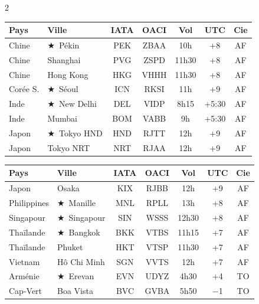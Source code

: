 \documentclass[9pt,a4paper,landscape]{article}
\newcommand{\sectionbanner}[2]{%
\noindent\colorbox{#1}{\parbox{\dimexpr\textwidth-2\fboxsep}{%
\vspace{3pt}\hspace{6pt}{\Large\bfseries\color{white}#2}\vspace{3pt}}}%
\vspace{4pt}%
}
\newcommand{\CAP}{\textcolor{capgold}{$\bigstar$}}
\begin{document}
\begin{multicols}{2}
\scriptsize
\begin{tabular}{@{}l l c c c c c@{}}
\toprule
\textbf{Pays} & \textbf{Ville} & \textbf{IATA} & \textbf{OACI} & \textbf{Vol} & \textbf{UTC} & \textbf{Cie} \\
\midrule
\rowcolor{asilight} Chine & \CAP\ Pékin & PEK & ZBAA & 10h & +8 & AF \\
Chine & Shanghai & PVG & ZSPD & 11h30 & +8 & AF \\
\rowcolor{asilight} Chine & Hong Kong & HKG & VHHH & 11h30 & +8 & AF \\
Corée S. & \CAP\ Séoul & ICN & RKSI & 11h & +9 & AF \\
\rowcolor{asilight} Inde & \CAP\ New Delhi & DEL & VIDP & 8h15 & +5:30 & AF \\
Inde & Mumbai & BOM & VABB & 9h & +5:30 & AF \\
\rowcolor{asilight} Japon & \CAP\ Tokyo HND & HND & RJTT & 12h & +9 & AF \\
Japon & Tokyo NRT & NRT & RJAA & 12h & +9 & AF \\
\bottomrule
\end{tabular}

\columnbreak

\begin{tabular}{@{}l l c c c c c@{}}
\toprule
\textbf{Pays} & \textbf{Ville} & \textbf{IATA} & \textbf{OACI} & \textbf{Vol} & \textbf{UTC} & \textbf{Cie} \\
\midrule
\rowcolor{asilight} Japon & Osaka & KIX & RJBB & 12h & +9 & AF \\
Philippines & \CAP\ Manille & MNL & RPLL & 13h & +8 & AF \\
\rowcolor{asilight} Singapour & \CAP\ Singapour & SIN & WSSS & 12h30 & +8 & AF \\
Thaïlande & \CAP\ Bangkok & BKK & VTBS & 11h15 & +7 & AF \\
\rowcolor{asilight} Thaïlande & Phuket & HKT & VTSP & 11h30 & +7 & AF \\
Vietnam & Hô Chi Minh & SGN & VVTS & 12h & +7 & AF \\
\rowcolor{asilight} Arménie & \CAP\ Erevan & EVN & UDYZ & 4h30 & +4 & TO \\
Cap-Vert & Boa Vista & BVC & GVBA & 5h50 & $-$1 & TO \\
\bottomrule
\end{tabular}
\end{multicols}

\sectionbanner{ameror}{AMÉRIQUES}
\end{document}

